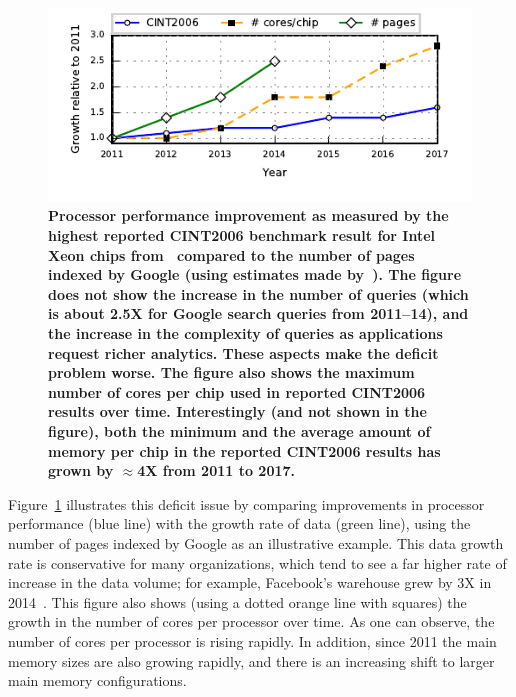 \begin{figure}
	\centering
	\includegraphics[width=\columnwidth]{system/figures/deficit.pdf}
	\caption{\textbf{Processor performance improvement as measured by the highest reported CINT2006 benchmark result for Intel Xeon chips from~\cite{cpu2006} compared to the number of pages indexed by Google (using estimates made by~\cite{google-pages-db}). The figure does not show the increase in the number of queries (which is about 2.5X for Google search queries from 2011--14), and the increase in the complexity of queries as applications request richer analytics. These aspects make the deficit problem worse. The figure also shows the maximum number of cores per chip used in reported CINT2006 results over time. Interestingly (and not shown in the figure), both the minimum and the average amount of memory per chip in the reported CINT2006 results has grown by $\approx$4X from 2011 to 2017.}}
	\label{fig-deficit}
\end{figure}

Figure~\ref{fig-deficit} illustrates this deficit issue by comparing improvements in processor performance (blue line) with the growth rate of data (green line), using the number of pages indexed by Google as an illustrative example. 
This data growth rate is conservative for many organizations, which tend to see a far higher rate of increase in the data volume; for example, Facebook's warehouse grew by 3X in 2014~\cite{fb-growth-14}. 
This figure also shows (using a dotted orange line with squares) the growth in the number of cores per processor over time. 
As one can observe, the number of cores per processor is rising rapidly. %
In addition, %
since 2011 the main memory sizes are also growing rapidly, and there is an increasing shift to larger main memory configurations. 

